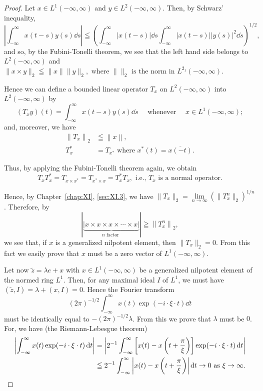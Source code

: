 \begin{proof}
 Let $x \in L^{1}(-\infty, \infty)$ and $y \in L^{2}(-\infty, \infty)$. Then, by Schwarz' inequality, 
\[
\left| \int_{- \infty} ^{\infty} x (t - s) y (s) \dd s \right| \leqq \left(\int_{- \infty} ^{\infty} | x (t - s) | \dd s \int_{- \infty} ^{\infty} | x (t - s) | | y (s) | ^{2} \dd s\right) ^{1/2},
\]
and so, by the Fubini-Tonelli theorem, we see that the left hand side belongs to $L^2(-\infty, \infty)$ and 
$\|x \times y\|_{2} \leqq \|x\| \|y\|_{2}, \text{ where } \|\|_{2} \text{ is the norm in } L^{2_1}(-\infty, \infty).$ 


Hence we can define a bounded linear operator $T_{x}$ on $L^{2}(-\infty, \infty)$ into $L^{2}(-\infty, \infty)$ by 
\begin{equation}\label{eq:XI.16.12}
(T _{x} y) (t) = \int_{- \infty} ^{\infty} x (t - s) y (s) \dd s \quad \text{ whenever } \quad x \in L ^{1} (- \infty , \infty);
\end{equation}
and, moreover, we have 
\begin{align}
\left\| T _{x} \right\| _{2}& \leqq \left\| x \right\|, \label{eq:XI.16.13} \\
T _{x} ^{*}& = T _ {x ^{*}} \text{ where } x ^{*} (t) = \overline {{x (- t)}}. \label{eq:XI.16.14}
\end{align}

Thus, by applying the Fubini-Tonelli theorem again, we obtain 
\begin{equation}\label{eq:XI.16.15}
T_{x}T_{x}^{*} = T_{x\times x^{*}} = T_{x^{*}\times x} = T_{x}^{*}T_{x}, \text{ i.e., } T_{x} \text{ is a normal operator.}
\end{equation}

Hence, by Chapter~\ref{chap:XI}, \ref{sec:XI.3}, we have $\| T_x \|_2 = \lim\limits_{n \to \infty} (\|T_x^n \|_2)^{1/n}$. Therefore, by 
\[
\left| \underbrace {\left| x \times x \times x \times \cdots \times x \right|} _ {n \text{ factor }} \right| \geqq \left\| T _{x} ^{n} \right\| _{2},
\]
we see that, if $x$ is a generalized nilpotent element, then $\| T_x \|_2 = 0$. From this fact we easily prove that $x$ must be a zero vector of $L^1(-\infty, \infty)$. 

Let now $\tilde{z} = \lambda e + x$ with $x \in L^{1}(-\infty, \infty)$ be a generalized nilpotent element of the normed ring $L^{1}$. Then, for any maximal ideal $I$ of $L^{1}$, we must have $(\tilde{z}, I) = \lambda + (x, I) = 0$. Hence the Fourier transform 
\[
(2 \pi) ^{-1/2} \int_{- \infty} ^{\infty} x (t) \exp (- i \cdot \xi \cdot t) \dd t
\]
must be identically equal to $-(2\pi)^{-1/2}\lambda$. From this we prove that $\lambda$ must be $0$. For, we have (the Riemann-Lebesgue theorem) 
\begin{align}
\left| \int_{- \infty} ^{\infty} x (t) \exp (- i \cdot \xi \cdot t) \mathop{}\!\mathrm{d} t \right|& = \left| 2 ^{-1} \int_{- \infty} ^{\infty} \left[ x (t) - x \left(t + \frac {\pi}{\xi}\right) \right] \exp (- i \cdot \xi \cdot t) \mathop{}\!\mathrm{d} t \right| \notag \\
&\leqq 2 ^{-1} \int_{- \infty} ^{\infty} \left| x (t) - x \left(t + \frac {\pi}{\xi}\right)\right| \mathop{}\!\mathrm{d} t \rightarrow 0 \text{ as } \xi \rightarrow \infty . \notag
\end{align}


\end{proof}
